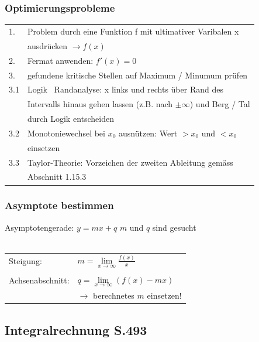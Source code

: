 		
		\subsubsection{Optimierungsprobleme}
		\begin{tabular}{ll}
		1. & Problem durch eine Funktion f mit ultimativer Varibalen x \\
		& ausdrücken $\rightarrow f(x)$ \\
		2. & Fermat anwenden: $f'(x) = 0$\\
		3. & gefundene kritische Stellen auf Maximum / Minumum prüfen \\
		3.1 & Logik \ Randanalyse: x links und rechts über Rand des \\
		& Intervalls hinaus gehen lassen (z.B. nach $\pm \infty$) und Berg / Tal \\
		& durch Logik entscheiden \\
		3.2 & Monotoniewechsel bei $x_0$ ausnützen: Wert $> x_0$ und $< x_0$ \\
		& einsetzen \\
		3.3 & Taylor-Theorie: Vorzeichen der zweiten Ableitung gemäss \\
		& Abschnitt 1.15.3 \\
		\end{tabular}				


		\subsubsection{Asymptote bestimmen}
		Asymptotengerade: $y = mx + q$		\qquad $m$ und $q$ sind gesucht \\
		\\
		\begin{tabular}{ll}
		Steigung: & $m = \lim \limits_{x \rightarrow \infty} \frac{f(x)}{x}$ \\
		\\
		Achsenabschnitt: & $q = \lim \limits_{x \rightarrow \infty} (f(x) - mx)$ \\
		& $\rightarrow$ berechnetes $m$ einsetzen! \\
		\end{tabular}
		
		
		
		
		\subsection{Integralrechnung S.493}
		
